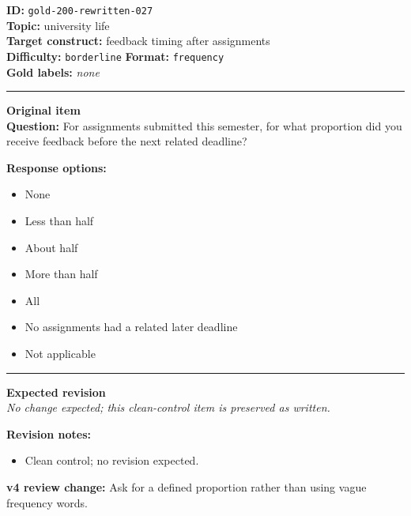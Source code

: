 \documentclass[10pt,a4paper]{article}
\newcommand{\sectionline}{\vspace{0.15em}\hrule\vspace{0.35em}}
\begin{document}
\begin{tcolorbox}[colframe=CleanGreen,colback=white,colbacktitle=CleanGreen!9,coltitle=black,title={Item 027\hfill Clean control}]
\textbf{ID:} \texttt{gold-200-rewritten-027}\\
\textbf{Topic:} university life\\
\textbf{Target construct:} feedback timing after assignments\\
\textbf{Difficulty:} \texttt{borderline} \quad \textbf{Format:} \texttt{frequency}\\
\textbf{Gold labels:} \textit{none}\\
\sectionline
\textbf{Original item}\\
\textbf{Question:} For assignments submitted this semester, for what proportion did you receive feedback before the next related deadline?
\par\textbf{Response options:}
\begin{itemize}
\item None
\item Less than half
\item About half
\item More than half
\item All
\item No assignments had a related later deadline
\item Not applicable
\end{itemize}
\sectionline
\textbf{Expected revision}\\
\textit{No change expected; this clean-control item is preserved as written.}
\par\textbf{Revision notes:}
\begin{itemize}
\item Clean control; no revision expected.
\end{itemize}
\par\textbf{v4 review change:} Ask for a defined proportion rather than using vague frequency words.
\end{tcolorbox}
\end{document}
